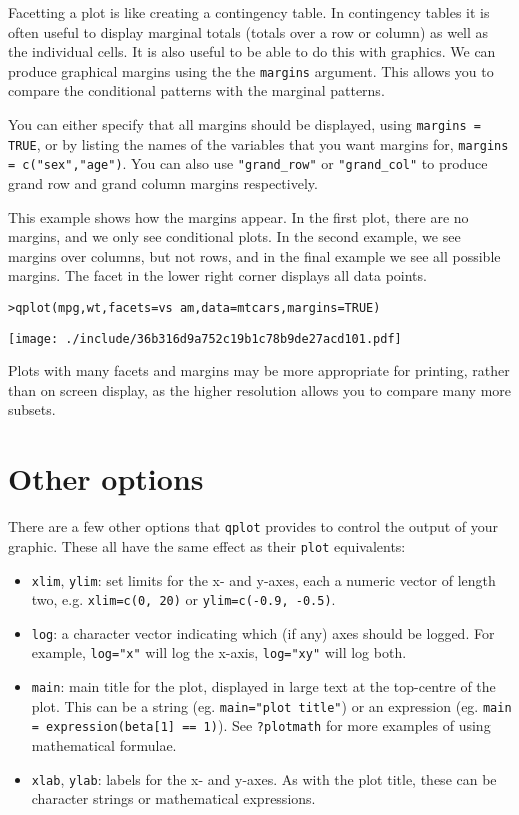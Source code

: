Facetting a plot is like creating a contingency table.  In contingency tables it is often useful to display marginal totals (totals over a row or column) as well as the individual cells.  It is also useful to be able to do this with graphics.  We can produce graphical margins using the the {\tt margins} argument.  This allows you to compare the conditional patterns with the marginal patterns.

You can either specify that all margins should be displayed, using {\tt margins = TRUE}, or by listing the names of the variables that you want margins for, {\tt margins = c("sex","age")}.  You can also use \verb|"grand_row"| or \verb|"grand_col"| to produce grand row and grand column margins respectively.

This example shows how the margins appear.  In the first plot, there are no margins, and we only see conditional plots.  In the second example, we see margins over columns, but not rows, and in the final example we see all possible margins.  The facet in the lower right corner displays all data points.

\begin{alltt}
> qplot(mpg, wt, facets = vs ~ am, data = mtcars, margins = TRUE)
\end{alltt}
\texttt{[image: ./include/36b316d9a752c19b1c78b9de27acd101.pdf]}
\begin{alltt}

\end{alltt}

Plots with many facets and margins may be more appropriate for printing, rather than on screen display, as the higher resolution allows you to compare many more subsets.

\section{Other options}\label{sec:other_options}

There are a few other options that {\tt qplot} provides to control the output of your graphic.  These all have the same effect as their {\tt plot} equivalents:

\begin{itemize}
	\item {\tt xlim}, {\tt ylim}: set limits for the x- and y-axes, each a numeric vector of length two, e.g. {\tt xlim=c(0, 20)} or {\tt ylim=c(-0.9, -0.5)}.
	\item {\tt log}: a character vector indicating which (if any) axes should be logged.  For example, {\tt log="x"} will log the x-axis, {\tt log="xy"} will log both.
	\item {\tt main}: main title for the plot, displayed in large text at the top-centre of the plot.  This can be a string (eg. {\tt main="plot title"}) or an expression (eg. {\tt main = expression(beta[1] == 1)}).  See {\tt ?plotmath} for more examples of using mathematical formulae.
	\item {\tt xlab}, {\tt ylab}: labels for the x- and y-axes.  As with the plot title, these can be character strings or mathematical expressions.
\end{itemize}

